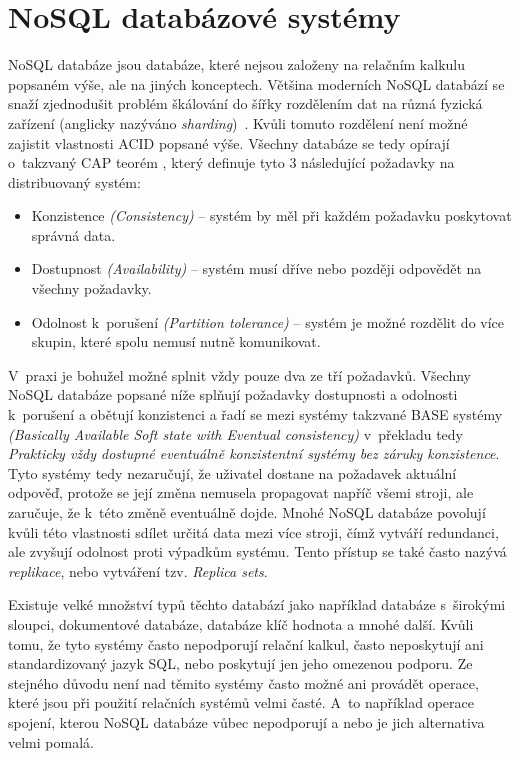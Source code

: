 \section{NoSQL databázové systémy}
NoSQL databáze jsou databáze, které nejsou založeny na relačním kalkulu popsaném výše, ale na jiných konceptech. Většina moderních NoSQL databází se snaží zjednodušit problém škálování do šířky rozdělením dat na různá fyzická zařízení (anglicky nazýváno \textit{sharding})~\cite{7327194}. Kvůli tomuto rozdělení není možné zajistit vlastnosti ACID popsané výše. Všechny databáze se tedy opírají o~takzvaný CAP teorém \cite{6122006}, který definuje tyto 3 následující požadavky na distribuovaný systém:

\begin{itemize}
\item Konzistence \textit{(Consistency)} -- systém by měl při každém požadavku poskytovat správná data.
\item Dostupnost \textit{(Availability)} -- systém musí dříve nebo později odpovědět na všechny požadavky.
\item Odolnost k~porušení \textit{(Partition tolerance)} -- systém je možné rozdělit do více skupin, které spolu nemusí nutně komunikovat.
\end{itemize}

V~praxi je bohužel možné splnit vždy pouze dva ze tří požadavků. Všechny NoSQL databáze popsané níže splňují požadavky dostupnosti a odolnosti k~porušení a obětují konzistenci a řadí se mezi systémy takzvané BASE \cite{OvercomingCap} systémy \textit{(Basically Available Soft state with Eventual consistency)} v~překladu tedy \textit{Prakticky vždy dostupné eventuálně konzistentní systémy bez záruky konzistence}. Tyto systémy tedy nezaručují, že uživatel dostane na požadavek aktuální odpověď, protože se její změna nemusela propagovat napříč všemi stroji, ale zaručuje, že k~této změně eventuálně dojde. Mnohé NoSQL databáze povolují kvůli této vlastnosti sdílet určitá data mezi více stroji, čímž vytváří redundanci, ale zvyšují odolnost proti výpadkům systému. Tento přístup se také často nazývá \textit{replikace}, nebo vytváření tzv. \textit{Replica sets}.

Existuje velké množství typů těchto databází jako například databáze s~širokými sloupci, dokumentové databáze, databáze klíč hodnota a mnohé další. Kvůli tomu, že tyto systémy často nepodporují relační kalkul, často neposkytují ani standardizovaný jazyk SQL, nebo poskytují jen jeho omezenou podporu. Ze stejného důvodu není nad těmito systémy často možné ani provádět operace, které jsou při použití relačních systémů velmi časté. A~to například operace spojení, kterou NoSQL databáze vůbec nepodporují a nebo je jich alternativa velmi pomalá. 

